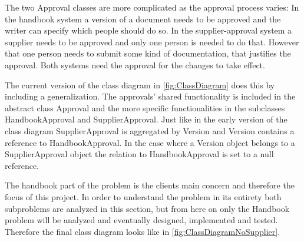 The two Approval classes are more complicated as the approval process varies:
In the handbook system a version of a document needs to be approved and the writer can specify which people should do so.
In the supplier-approval system a supplier needs to be approved and only one person is needed to do that.
However that one person needs to submit some kind of documentation, that justifies the approval.
Both systems need the approval for the changes to take effect.

The current version of the class diagram in \cref{fig:ClassDiagram} does this by including a generalization. The approvals' shared functionality is included in the abstract class Approval and the more specific functionalities in the subclasses HandbookApproval and SupplierApproval.
Just like in the early version of the class diagram SupplierApproval is aggregated by Version and Version contains a reference to HandbookApproval.
In the case where a Version object belongs to a SupplierApproval object the relation to HandbookApproval is set to a null reference.

The handbook part of the problem is the clients main concern and therefore the focus of this project.
In order to understand the problem in its entirety both subproblems are analyzed in this section, but from here on  only the Handbook problem will be analyzed and eventually designed, implemented and tested.
Therefore the final class diagram looks like in \cref{fig:ClassDiagramNoSupplier}.

